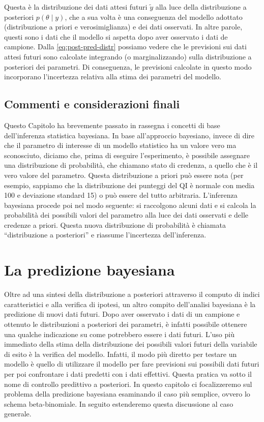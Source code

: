 \documentclass[
  11pt,
]{krantz}
\theoremstyle{definition}
\theoremstyle{definition}
\theoremstyle{definition}
\theoremstyle{definition}
\theoremstyle{remark}
\begin{document}
Questa è la distribuzione dei dati attesi futuri \(\tilde{y}\) alla luce della distribuzione a posteriori \(p(\theta \mid y)\), che a sua volta è una conseguenza del modello adottato (distribuzione a priori e verosimiglianza) e dei dati osservati. In altre parole, questi sono i dati che il modello si aspetta dopo aver osservato i dati de campione. Dalla \eqref{eq:post-pred-distr} possiamo vedere che le previsioni sui dati attesi futuri sono calcolate integrando (o marginalizzando) sulla distribuzione a posteriori dei parametri. Di conseguenza, le previsioni calcolate in questo modo incorporano l'incertezza relativa alla stima dei parametri del modello.

\hypertarget{commenti-e-considerazioni-finali}{%
\section*{Commenti e considerazioni finali}\label{commenti-e-considerazioni-finali}}


Questo Capitolo ha brevemente passato in rassegna i concetti di base dell'inferenza statistica bayesiana. In base all'approccio bayesiano, invece di dire che il parametro di interesse di un modello statistico ha un valore vero ma sconosciuto, diciamo che, prima di eseguire l'esperimento, è possibile assegnare una distribuzione di probabilità, che chiamano stato di credenza, a quello che è il vero valore del parametro. Questa distribuzione a priori può essere nota (per esempio, sappiamo che la distribuzione dei punteggi del QI è normale con media 100 e deviazione standard 15) o può essere del tutto arbitraria. L'inferenza bayesiana procede poi nel modo seguente: si raccolgono alcuni dati e si calcola la probabilità dei possibili valori del parametro alla luce dei dati osservati e delle credenze a priori. Questa nuova distribuzione di probabilità è chiamata ``distribuzione a posteriori'' e riassume l'incertezza dell'inferenza.

\hypertarget{ch-prediction}{%
\chapter{La predizione bayesiana}\label{ch-prediction}}

Oltre ad una sintesi della distribuzione a posteriori attraverso il computo di indici caratteristici e alla verifica di ipotesi, un altro compito dell'analisi bayesiana è la predizione di nuovi dati futuri. Dopo aver osservato i dati di un campione e ottenuto le distribuzioni a posteriori dei parametri, è infatti possibile ottenere una qualche indicazione su come potrebbero essere i dati futuri. L'uso più immediato della stima della distribuzione dei possibili valori futuri della variabile di esito è la verifica del modello. Infatti, il modo più diretto per testare un modello è quello di utilizzare il modello per fare previsioni sui possibili dati futuri per poi confrontare i dati predetti con i dati effettivi. Questa pratica va sotto il nome di controllo predittivo a posteriori. In questo capitolo ci focalizzeremo sul problema della predizione bayesiana esaminando il caso più semplice, ovvero lo schema beta-binomiale. In seguito estenderemo questa discussione al caso generale.
\end{document}

